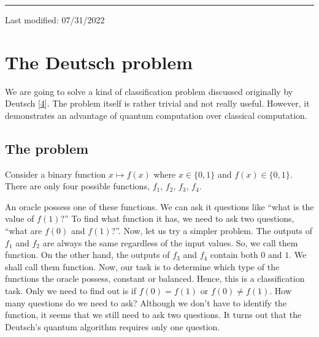 \documentclass[letterpaper,10pt,english]{jupyterBook}
\begin{document}
\bigskip\hrule\bigskip


\sphinxAtStartPar
Last modified: 07/31/2022

\sphinxstepscope


\section{The Deutsch problem}
\label{\detokenize{algorithms/deutsch:the-deutsch-problem}}\label{\detokenize{algorithms/deutsch:sec-deustch}}\label{\detokenize{algorithms/deutsch::doc}}
\sphinxAtStartPar
We are going to solve a kind of classification problem discussed originally by Deutsch {[}\hyperlink{cite.references:id17}{4}{]}.   The problem itself is rather trivial and not really useful. However, it demonstrates an advantage of quantum computation over classical computation.


\subsection{The problem}
\label{\detokenize{algorithms/deutsch:the-problem}}
\sphinxAtStartPar
Consider a binary function \(x \mapsto f(x)\) where \(x \in \{0,1\}\) and \(f(x)  \in \{0,1\}\). There are only four possible functions, \(f_1,\, f_2,\, f_3,\, f_4\).



\sphinxAtStartPar
An oracle possess one of these functions.  We can ask it questions like “what is the value of \(f(1)\)?”  To find what function it has, we need to ask two questions, “what are \(f(0)\) and \(f(1)\)?”.  Now, let us try a simpler problem.  The outputs of \(f_1\) and \(f_2\) are always the same regardless of the input values.  So, we call them  function.  On the other hand, the outputs of \(f_3\) and \(f_4\) contain both \(0\) and \(1\).  We shall call them  function.  Now, our task is to determine which type of the functions the oracle possess, constant or balanced. Hence, this is a classification task. Only we need to find out is if \(f(0)=f(1)\) or \(f(0)\ne f(1)\).  How many questions do we need to ask?  Although we don’t have to identify the function, it seems that we still need to ask two questions. It turns out that the Deutsch’s quantum algorithm requires only one question.
\end{document}
